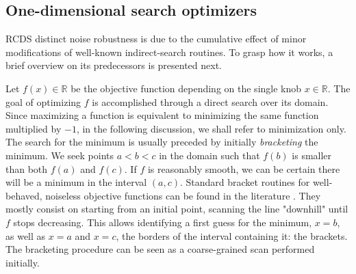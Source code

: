 \subsection{One-dimensional search optimizers}
RCDS distinct noise robustness is due to the cumulative effect of minor modifications of well-known indirect-search routines. To grasp how it works, a brief overview on its predecessors is presented next.


Let $f(x)\in\mathbb{R}$ be the objective function depending on the single knob $x\in\mathbb{R}$. The goal of optimizing $f$ is accomplished through a direct search over its domain. Since maximizing a function is equivalent to minimizing the same function multiplied by $-1$, in the following discussion, we shall refer to minimization only. The search for the minimum is usually preceded by initially \textit{bracketing} the minimum. We seek points $a < b < c$ in the domain such that $f(b)$ is smaller than both $f(a)$ and $f(c)$. If $f$ is reasonably smooth, we can be certain there will be a minimum in the interval $(a, c)$. Standard bracket routines for well-behaved, noiseless objective functions can be found in the literature \cite[section 10.1]{press_numerical_2007}. They mostly consist on starting from an initial point, scanning the line "downhill" until $f$ stops decreasing. This allows identifying a first guess for the minimum, $x=b$, as well as $x=a$ and $x=c$, the borders of the interval containing it: the brackets. The bracketing procedure can be seen as a coarse-grained scan performed initially.

